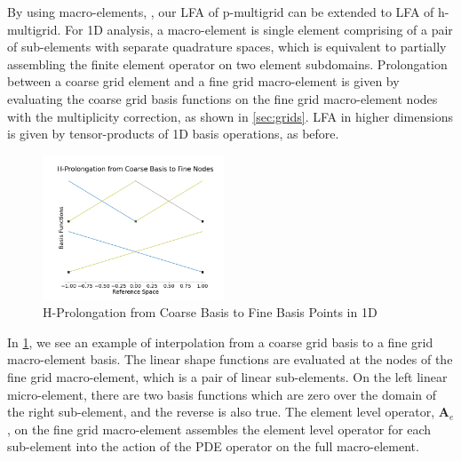 \documentclass[review]{siamart190516}
\begin{document}
By using macro-elements, \cite{kumar2019local, brown2019local}, our LFA of p-multigrid can be extended to LFA of h-multigrid.
For 1D analysis, a macro-element is single element comprising of a pair of sub-elements with separate quadrature spaces, which is equivalent to partially assembling the finite element operator on two element subdomains.
Prolongation between a coarse grid element and a fine grid macro-element is given by evaluating the coarse grid basis functions on the fine grid macro-element nodes with the multiplicity correction, as shown in \cref{sec:grids}.
LFA in higher dimensions is given by tensor-products of 1D basis operations, as before.

\begin{figure}[!ht]
  \centering
  \includegraphics[width=0.48\textwidth]{img/hProlongation}
  \caption{H-Prolongation from Coarse Basis to Fine Basis Points in 1D}
  \label{fig:h_prolongation}
\end{figure}

In \cref{fig:h_prolongation}, we see an example of interpolation from a coarse grid basis to a fine grid macro-element basis.
The linear shape functions are evaluated at the nodes of the fine grid macro-element, which is a pair of linear sub-elements.
On the left linear micro-element, there are two basis functions which are zero over the domain of the right sub-element, and the reverse is also true.
The element level operator, $\mathbf{A}_e$, on the fine grid macro-element assembles the element level operator for each sub-element into the action of the PDE operator on the full macro-element.
\end{document}
